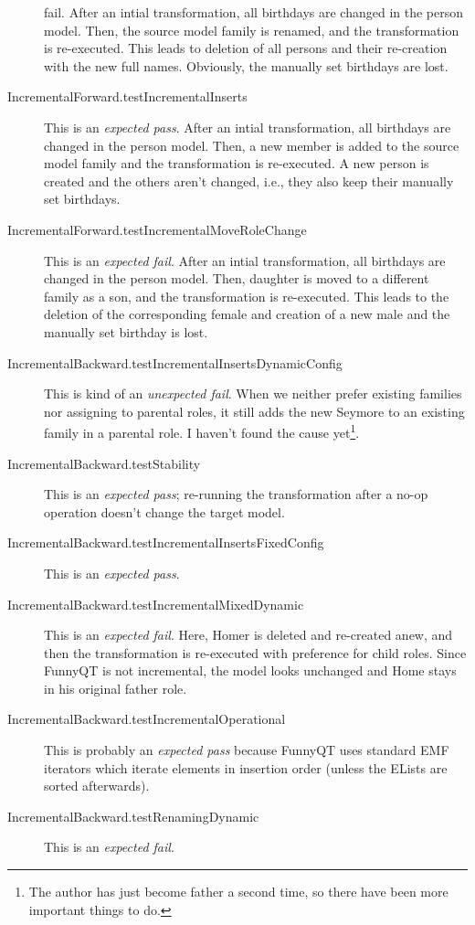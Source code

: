 \documentclass[a4paper]{article}
\begin{document}
\begin{description}
{    fail}.  After an intial transformation, all birthdays are changed in the
  person model.  Then, the source model family is renamed, and the
  transformation is re-executed.  This leads to deletion of all persons and
  their re-creation with the new full names.  Obviously, the manually set
  birthdays are lost.
\item[IncrementalForward.testIncrementalInserts] This is an \emph{expected
    pass}.  After an intial transformation, all birthdays are changed in the
  person model.  Then, a new member is added to the source model family and the
  transformation is re-executed.  A new person is created and the others aren't
  changed, i.e., they also keep their manually set birthdays.
\item[IncrementalForward.testIncrementalMoveRoleChange] This is an
  \emph{expected fail}.  After an intial transformation, all birthdays are
  changed in the person model.  Then, daughter is moved to a different family
  as a son, and the transformation is re-executed.  This leads to the deletion
  of the corresponding female and creation of a new male and the manually set
  birthday is lost.
\item[IncrementalBackward.testIncrementalInsertsDynamicConfig] This is kind of
  an \emph{unexpected fail}.  When we neither prefer existing families nor
  assigning to parental roles, it still adds the new Seymore to an existing
  family in a parental role.  I haven't found the cause yet\footnote{The author
    has just become father a second time, so there have been more important
    things to do.}.
\item[IncrementalBackward.testStability] This is an \emph{expected pass};
  re-running the transformation after a no-op operation doesn't change the
  target model.
\item[IncrementalBackward.testIncrementalInsertsFixedConfig] This is an
  \emph{expected pass}.
\item[IncrementalBackward.testIncrementalMixedDynamic] This is an
  \emph{expected fail}.  Here, Homer is deleted and re-created anew, and then
  the transformation is re-executed with preference for child roles.  Since
  FunnyQT is not incremental, the model looks unchanged and Home stays in his
  original father role.
\item[IncrementalBackward.testIncrementalOperational] This is probably an
  \emph{expected pass} because FunnyQT uses standard EMF iterators which
  iterate elements in insertion order (unless the ELists are sorted
  afterwards).
\item[IncrementalBackward.testRenamingDynamic] This is an \emph{expected fail}.

\end{description}
\end{document}
